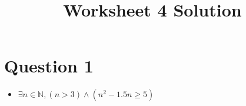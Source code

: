 \documentclass[12pt]{article}
\begin{document}
\title{Worksheet 4 Solution}
\maketitle

\section*{Question 1}
\begin{itemize}
    \item $\exists n \in \mathbb{N}, (n > 3) \land (n^2-1.5n \geq 5)$

\end{itemize}
\end{document}
